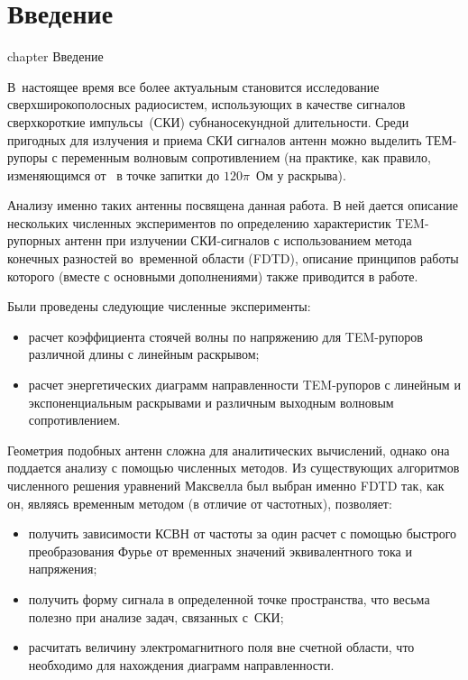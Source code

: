 %
%
%
\chapter* {Введение}
 {chapter} {Введение}

В~настоящее время все более актуальным становится исследование
сверхширокополосных радиосистем, использующих в качестве сигналов сверхкороткие
импульсы~(СКИ) субнаносекундной длительности. Среди пригодных для излучения
и приема СКИ сигналов антенн можно выделить ТЕМ-рупоры с переменным волновым
сопротивлением (на практике, как правило, изменяющимся от~ в точке
запитки до $120\pi$~Ом у раскрыва).

Анализу именно таких антенны посвящена данная работа. В ней дается описание
нескольких численных экспериментов по определению характеристик TEM-рупорных
антенн при излучении СКИ-сигналов с использованием метода конечных разностей
во~временной области (FDTD), описание принципов работы которого (вместе
с основными дополнениями) также приводится в работе.

Были проведены следующие численные эксперименты:
\begin{itemize}
\item расчет коэффициента стоячей волны по напряжению для TEM-рупоров различной
      длины с линейным раскрывом;
\item расчет энергетических диаграмм направленности TEM-рупоров с линейным
      и экспоненциальным раскрывами и различным выходным волновым сопротивлением.
\end{itemize}
Геометрия подобных антенн сложна для аналитических вычислений, однако она
поддается анализу с помощью численных методов. Из существующих алгоритмов
численного решения уравнений Максвелла был выбран именно FDTD так, как он,
являясь временным методом (в отличие от частотных), позволяет:
\begin{itemize}
\item получить зависимости КСВН от частоты за один расчет с помощью быстрого
      преобразования Фурье от временных значений эквивалентного тока
      и напряжения;
\item получить форму сигнала в определенной точке пространства, что весьма
      полезно при анализе задач, связанных с~СКИ;
\item расчитать величину электромагнитного поля вне счетной области, что необходимо
      для нахождения диаграмм направленности.
\end{itemize}

